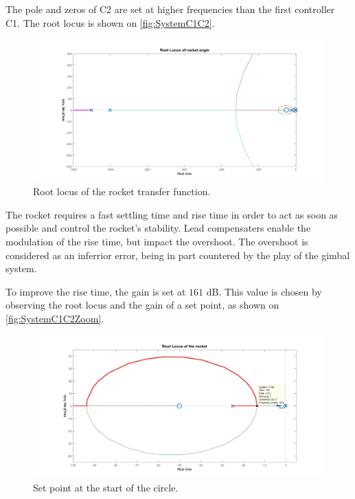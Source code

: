The pole and zeros of C2 are set at higher frequencies than the first controller C1. The root locus is shown on \autoref{fig:SystemC1C2}.

\begin{figure}[htbp]
	\centering
	
		\includegraphics[width=\textwidth]{figures/Rocket/design/tf_with_controller_1_vf2}
		\caption{Root locus of the rocket transfer function.}
		\label{fig:SystemC1C2}
		
\end{figure}

The rocket requires a fast settling time and rise time in order to act as soon as possible and control the rocket's stability. Lead compensaters enable the modulation of the rise time, but impact the overshoot. The overshoot is considered as an inferrior error, being in part countered by the play of the gimbal system. 

To improve the rise time, the gain is set at $161$ \si{\dB}. This value is chosen by observing the root locus and the gain of a set point, as shown on \autoref{fig:SystemC1C2Zoom}. 

\begin{figure}[htbp]
	\centering
	
	\includegraphics[width=\textwidth]{figures/Rocket/design/tf_with_controller_1_zoom_v3}
	\caption{Set point at the start of the circle.}
	\label{fig:SystemC1C2Zoom}
	
\end{figure}

